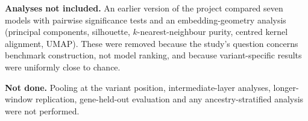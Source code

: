\documentclass[11pt]{article}
\begin{document}
\textbf{Analyses not included.} An earlier version of the project compared seven models with pairwise significance tests and an embedding-geometry analysis (principal components, silhouette, $k$-nearest-neighbour purity, centred kernel alignment, UMAP). These were removed because the study's question concerns benchmark construction, not model ranking, and because variant-specific results were uniformly close to chance.

\textbf{Not done.} Pooling at the variant position, intermediate-layer analyses, longer-window replication, gene-held-out evaluation and any ancestry-stratified analysis were not performed.
\end{document}
